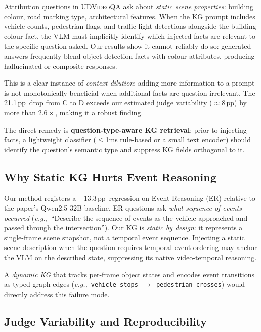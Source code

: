 \documentclass[10pt,conference,compsoc]{IEEEtran}
\newcommand{\dataset}{\textsc{UDVideoQA}}
\newcommand{\pp}{\,pp}                     %
\newcommand{\eg}{\textit{e.g.,}~}
\begin{document}
Attribution questions in \dataset{} ask about
\emph{static scene properties}: building colour, road marking
type, architectural features.
When the KG prompt includes vehicle counts, pedestrian flags,
and traffic light detections alongside the building colour fact,
the VLM must implicitly identify which injected facts are
relevant to the specific question asked.
Our results show it cannot reliably do so: generated answers
frequently blend object-detection facts with colour attributes,
producing hallucinated or composite responses.

This is a clear instance of \emph{context dilution}:
adding more information to a prompt is not monotonically
beneficial when additional facts are question-irrelevant.
The 21.1\pp\ drop from C to D exceeds our estimated judge
variability (${\approx}8$\pp) by more than $2.6\times$, making it
a robust finding.

The direct remedy is \textbf{question-type-aware KG retrieval}:
prior to injecting facts, a lightweight classifier
($\le$1ms rule-based or a small text encoder) should identify the
question's semantic type and suppress KG fields orthogonal to it.

\subsection{Why Static KG Hurts Event Reasoning}
\label{sec:discussion:er}

Our method registers a $-$13.3\pp\ regression on Event Reasoning
(ER) relative to the paper's Qwen2.5-32B baseline.
ER questions ask \emph{what sequence of events occurred}
(\eg ``Describe the sequence of events as the vehicle approached
and passed through the intersection'').
Our KG is \emph{static by design}: it represents a single-frame
scene snapshot, not a temporal event sequence.
Injecting a static scene description when the question requires
temporal event ordering may anchor the VLM on the described state,
suppressing its native video-temporal reasoning.

A \emph{dynamic KG} that tracks per-frame object states and
encodes event transitions as typed graph edges
(\eg \texttt{vehicle\_stops $\to$ pedestrian\_crosses}) would
directly address this failure mode.

\subsection{Judge Variability and Reproducibility}
\label{sec:discussion:judge}
\end{document}
